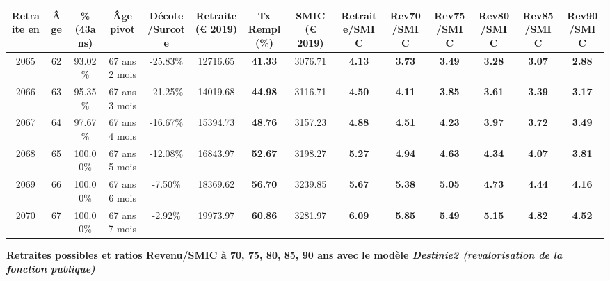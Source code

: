 \begin{adjustbox}{max width=\textwidth} 
\begin{tabular}[htb]{|c|c||c|c|c||c|c||c||c|c|c|c|c|c|} 
\hline 
 Retraite en &  Âge &  \%(43ans) &  Âge pivot &  Décote/Surcote &  Retraite (\euro{} 2019) &  Tx Rempl(\%) &  SMIC (\euro{} 2019) &  Retraite/SMIC &  Rev70/SMIC &  Rev75/SMIC &  Rev80/SMIC &  Rev85/SMIC &  Rev90/SMIC \\ 
\hline \hline 
 2065 &  62 &  93.02\% &  67 ans 2 mois &  -25.83\% &  12716.65 &  {\bf 41.33} &  3076.71 &  {\bf 4.13} &  {\bf 3.73} &  {\bf 3.49} &  {\bf 3.28} &  {\bf 3.07} &  {\bf 2.88} \\ 
\hline 
 2066 &  63 &  95.35\% &  67 ans 3 mois &  -21.25\% &  14019.68 &  {\bf 44.98} &  3116.71 &  {\bf 4.50} &  {\bf 4.11} &  {\bf 3.85} &  {\bf 3.61} &  {\bf 3.39} &  {\bf 3.17} \\ 
\hline 
 2067 &  64 &  97.67\% &  67 ans 4 mois &  -16.67\% &  15394.73 &  {\bf 48.76} &  3157.23 &  {\bf 4.88} &  {\bf 4.51} &  {\bf 4.23} &  {\bf 3.97} &  {\bf 3.72} &  {\bf 3.49} \\ 
\hline 
 2068 &  65 &  100.00\% &  67 ans 5 mois &  -12.08\% &  16843.97 &  {\bf 52.67} &  3198.27 &  {\bf 5.27} &  {\bf 4.94} &  {\bf 4.63} &  {\bf 4.34} &  {\bf 4.07} &  {\bf 3.81} \\ 
\hline 
 2069 &  66 &  100.00\% &  67 ans 6 mois &  -7.50\% &  18369.62 &  {\bf 56.70} &  3239.85 &  {\bf 5.67} &  {\bf 5.38} &  {\bf 5.05} &  {\bf 4.73} &  {\bf 4.44} &  {\bf 4.16} \\ 
\hline 
 2070 &  67 &  100.00\% &  67 ans 7 mois &  -2.92\% &  19973.97 &  {\bf 60.86} &  3281.97 &  {\bf 6.09} &  {\bf 5.85} &  {\bf 5.49} &  {\bf 5.15} &  {\bf 4.82} &  {\bf 4.52} \\ 
\hline 
\hline 
\end{tabular} 
\end{adjustbox} 
 
 \vspace{0.1cm} 
{\bf \noindent Retraites possibles et ratios Revenu/SMIC à 70, 75, 80, 85, 90 ans avec le modèle \emph{Destinie2 (revalorisation de la fonction publique)}}  
 
